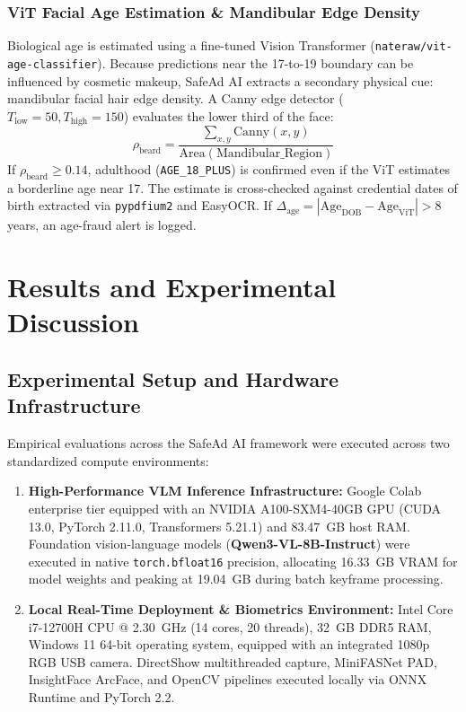 \documentclass[12pt,a4paper]{report}
\begin{document}
\subsection{ViT Facial Age Estimation \& Mandibular Edge Density}
Biological age is estimated using a fine-tuned Vision Transformer (\texttt{nateraw/vit-age-classifier}). Because predictions near the 17-to-19 boundary can be influenced by cosmetic makeup, SafeAd AI extracts a secondary physical cue: mandibular facial hair edge density. A Canny edge detector ($T_{\text{low}}=50, T_{\text{high}}=150$) evaluates the lower third of the face:
\begin{equation}
\rho_{\text{beard}} = \frac{\sum_{x, y} \text{Canny}(x, y)}{\text{Area}(\text{Mandibular\_Region})}
\end{equation}
If $\rho_{\text{beard}} \ge 0.14$, adulthood (\texttt{AGE\_18\_PLUS}) is confirmed even if the ViT estimates a borderline age near 17. The estimate is cross-checked against credential dates of birth extracted via \texttt{pypdfium2} and EasyOCR. If $\Delta_{\text{age}} = |\text{Age}_{\text{DOB}} - \text{Age}_{\text{ViT}}| > 8$ years, an age-fraud alert is logged.




\chapter{Results and Experimental Discussion}

\section{Experimental Setup and Hardware Infrastructure}

Empirical evaluations across the SafeAd AI framework were executed across two standardized compute environments:
\begin{enumerate}
    \item \textbf{High-Performance VLM Inference Infrastructure:} Google Colab enterprise tier equipped with an NVIDIA A100-SXM4-40GB GPU (CUDA 13.0, PyTorch 2.11.0, Transformers 5.21.1) and 83.47~GB host RAM. Foundation vision-language models (\textbf{Qwen3-VL-8B-Instruct}) were executed in native \texttt{torch.bfloat16} precision, allocating 16.33~GB VRAM for model weights and peaking at 19.04~GB during batch keyframe processing.
    \item \textbf{Local Real-Time Deployment & Biometrics Environment:} Intel Core i7-12700H CPU @ 2.30~GHz (14 cores, 20 threads), 32~GB DDR5 RAM, Windows 11 64-bit operating system, equipped with an integrated 1080p RGB USB camera. DirectShow multithreaded capture, MiniFASNet PAD, InsightFace ArcFace, and OpenCV pipelines executed locally via ONNX Runtime and PyTorch 2.2.
\end{enumerate}
\end{document}
